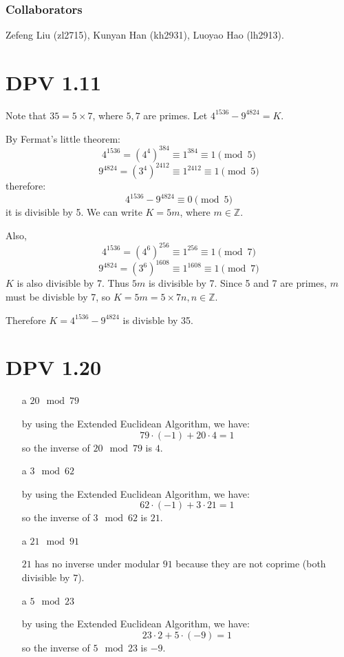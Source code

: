 \documentclass[twoside]{homework}
\begin{document}
\maketitle
\subsubsection*{Collaborators}
Zefeng Liu (zl2715), Kunyan Han (kh2931), Luoyao Hao (lh2913).

\section{DPV 1.11}
Note that $35 = 5 \times 7$, where $5, 7$ are primes. Let $4^{1536}-9^{4824} = K$.

By Fermat's little theorem:
\[4^{1536} = (4^{4})^{384} \equiv 1^{384} \equiv 1 \pmod 5\]
\[9^{4824} = (3^4)^{2412} \equiv 1^{2412} \equiv 1 \pmod 5\]
therefore:
\[4^{1536}-9^{4824} \equiv 0 \pmod 5\]
it is divisible by 5. We can write $K = 5m$, where $m \in \mathbb{Z}$.

Also,
\[4^{1536} = (4^{6})^{256} \equiv 1^{256} \equiv 1 \pmod 7\]
\[9^{4824} = (3^6)^{1608} \equiv 1^{1608} \equiv 1 \pmod 7\]
$K$ is also divisible by 7. Thus $5m$ is divisible by 7. Since 5 and 7 are primes, $m$ must be divisble by 7, so $ K=5m = 5\times 7n, n\in\mathbb{Z}$.

Therefore $K=4^{1536}-9^{4824}$ is divisble by 35.

\section{DPV 1.20}
\begin{enumerate}
	\item [a] $20 \mod 79$

		by using the Extended Euclidean Algorithm, we have:
		\[79 \cdot (-1) + 20 \cdot 4 = 1\]
		so the inverse of $20 \mod 79$ is $4$.
	\item [a] $3 \mod 62$

		by using the Extended Euclidean Algorithm, we have:
		\[62 \cdot (-1) + 3 \cdot 21 = 1\]
		so the inverse of $3 \mod 62$ is $21$.
	\item [a] $21 \mod 91$

		$21$ has no inverse under modular $91$ because they are not coprime (both divisible by $7$).
	\item [a] $5 \mod 23$

		by using the Extended Euclidean Algorithm, we have:
		\[23 \cdot 2 + 5 \cdot (-9) = 1\]
		so the inverse of $5 \mod 23$ is $-9$.
\end{enumerate}
\end{document}
